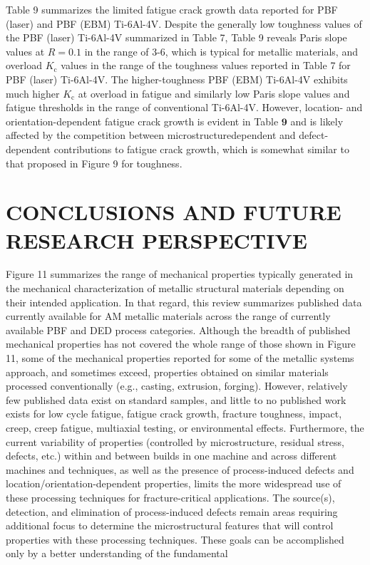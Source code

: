 \documentclass[10pt]{article}
\begin{document}
Table 9 summarizes the limited fatigue crack growth data reported for PBF (laser) and PBF (EBM) Ti-6Al-4V. Despite the generally low toughness values of the PBF (laser) Ti-6Al-4V summarized in Table 7, Table 9 reveals Paris slope values at $R=0.1$ in the range of 3-6, which is typical for metallic materials, and overload $K_{\mathrm{c}}$ values in the range of the toughness values reported in Table 7 for PBF (laser) Ti-6Al-4V. The higher-toughness PBF (EBM) Ti-6Al-4V exhibits much higher $K_{\mathrm{c}}$ at overload in fatigue and similarly low Paris slope values and fatigue thresholds in the range of conventional Ti-6Al-4V. However, location- and orientation-dependent fatigue crack growth is evident in Table $\mathbf{9}$ and is likely affected by the competition between microstructuredependent and defect-dependent contributions to fatigue crack growth, which is somewhat similar to that proposed in Figure 9 for toughness.

\section*{CONCLUSIONS AND FUTURE RESEARCH PERSPECTIVE}
Figure 11 summarizes the range of mechanical properties typically generated in the mechanical characterization of metallic structural materials depending on their intended application. In that regard, this review summarizes published data currently available for AM metallic materials across the range of currently available PBF and DED process categories. Although the breadth of published mechanical properties has not covered the whole range of those shown in Figure 11, some of the mechanical properties reported for some of the metallic systems approach, and sometimes exceed, properties obtained on similar materials processed conventionally (e.g., casting, extrusion, forging). However, relatively few published data exist on standard samples, and little to no published work exists for low cycle fatigue, fatigue crack growth, fracture toughness, impact, creep, creep fatigue, multiaxial testing, or environmental effects. Furthermore, the current variability of properties (controlled by microstructure, residual stress, defects, etc.) within and between builds in one machine and across different machines and techniques, as well as the presence of process-induced defects and location/orientation-dependent properties, limits the more widespread use of these processing techniques for fracture-critical applications. The source(s), detection, and elimination of process-induced defects remain areas requiring additional focus to determine the microstructural features that will control properties with these processing techniques. These goals can be accomplished only by a better understanding of the fundamental
\end{document}
